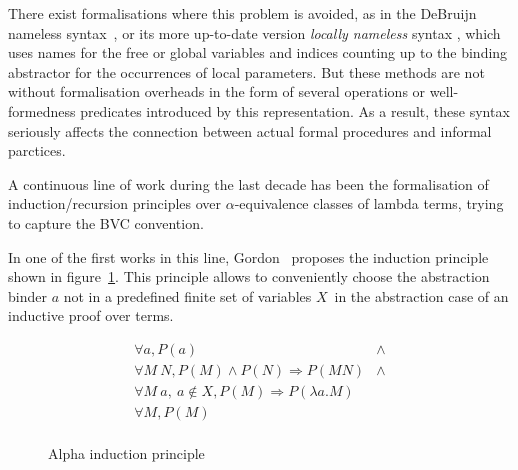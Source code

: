 \documentclass[preprint,10pt]{sigplanconf}
\newcommand{\alp}{\ensuremath{\alpha}}
\newcommand{\lam}{\ensuremath{\lambda}}
\begin{document}
There exist formalisations where this problem is avoided, as in the DeBruijn nameless syntax~\cite{deBruijn1972}, or its more up-to-date version \textit{locally nameless} syntax \cite{aydemir08,chargueraud12}, which uses names for the free or global variables and  indices counting up to the binding abstractor for the occurrences of local parameters. But these methods are not without formalisation overheads in the form of several  operations or well-formedness predicates introduced by this representation. As a result, these syntax seriously affects the connection between actual formal procedures and informal parctices.

A continuous line of work during the last decade has been the formalisation of  induction/recursion principles over \alp-equivalence classes of lambda terms, trying to capture the BVC convention. 

In one of the first works in this line, Gordon~\cite{gordon:mechanisation:1993} proposes the induction principle shown in figure~\ref{fig:alphainduction}. This principle allows to conveniently choose the abstraction binder $a$ not in a predefined finite set of variables $X$\ in the abstraction case of an inductive proof over terms.

\begin{figure}[h]
\[ 
  \begin{array}{lc}
    \forall a, P(a) & \wedge\\
    \forall M\ N,  P(M) \wedge P(N)  \Rightarrow P (M N) & \wedge \\    
    \forall M\ a,\  a \not\in X, P(M)   \Rightarrow P (\lam a. M) \\    
    \hline
    \forall M, P(M)\\
  \end{array}
\]
  \caption{Alpha induction principle}
  \label{fig:alphainduction}
\end{figure}
\end{document}
